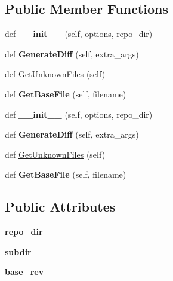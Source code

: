 \subsection*{Public Member Functions}
\begin{DoxyCompactItemize}
\item 
\mbox{\label{classupload_1_1_mercurial_v_c_s_a33890f442dedbb7d9fd45c08b5baed56}} 
def {\bfseries \+\_\+\+\_\+init\+\_\+\+\_\+} (self, options, repo\+\_\+dir)
\item 
\mbox{\label{classupload_1_1_mercurial_v_c_s_a6c05746012d8cd435c94ace1465671ef}} 
def {\bfseries Generate\+Diff} (self, extra\+\_\+args)
\item 
def \mbox{\hyperlink{classupload_1_1_mercurial_v_c_s_a6190899fb86cd09ad84cc5d4b0ebd2f3}{Get\+Unknown\+Files}} (self)
\item 
\mbox{\label{classupload_1_1_mercurial_v_c_s_a0cdc0cbe6ac4daab82f5f01e6ae2e670}} 
def {\bfseries Get\+Base\+File} (self, filename)
\item 
\mbox{\label{classupload_1_1_mercurial_v_c_s_a33890f442dedbb7d9fd45c08b5baed56}} 
def {\bfseries \+\_\+\+\_\+init\+\_\+\+\_\+} (self, options, repo\+\_\+dir)
\item 
\mbox{\label{classupload_1_1_mercurial_v_c_s_a6c05746012d8cd435c94ace1465671ef}} 
def {\bfseries Generate\+Diff} (self, extra\+\_\+args)
\item 
def \mbox{\hyperlink{classupload_1_1_mercurial_v_c_s_a6190899fb86cd09ad84cc5d4b0ebd2f3}{Get\+Unknown\+Files}} (self)
\item 
\mbox{\label{classupload_1_1_mercurial_v_c_s_a0cdc0cbe6ac4daab82f5f01e6ae2e670}} 
def {\bfseries Get\+Base\+File} (self, filename)
\end{DoxyCompactItemize}
\subsection*{Public Attributes}
\begin{DoxyCompactItemize}
\item 
\mbox{\label{classupload_1_1_mercurial_v_c_s_a219c1e0ab9ce864e3231913762ea489b}} 
{\bfseries repo\+\_\+dir}
\item 
\mbox{\label{classupload_1_1_mercurial_v_c_s_a0dad32e621f5523e3430d867184f0b42}} 
{\bfseries subdir}
\item 
\mbox{\label{classupload_1_1_mercurial_v_c_s_a41faae7820d5a015f4a42476e5e4ab8c}} 
{\bfseries base\+\_\+rev}
\end{DoxyCompactItemize}


